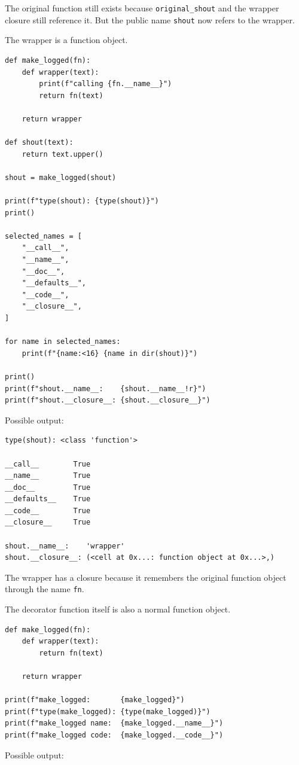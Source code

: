 The original function still exists because \texttt{original\_shout} and the wrapper closure still reference it. But the public name \texttt{shout} now refers to the wrapper.

The wrapper is a function object.

\begin{verbatim}
def make_logged(fn):
    def wrapper(text):
        print(f"calling {fn.__name__}")
        return fn(text)

    return wrapper

def shout(text):
    return text.upper()

shout = make_logged(shout)

print(f"type(shout): {type(shout)}")
print()

selected_names = [
    "__call__",
    "__name__",
    "__doc__",
    "__defaults__",
    "__code__",
    "__closure__",
]

for name in selected_names:
    print(f"{name:<16} {name in dir(shout)}")

print()
print(f"shout.__name__:    {shout.__name__!r}")
print(f"shout.__closure__: {shout.__closure__}")
\end{verbatim}

Possible output:

\begin{verbatim}
type(shout): <class 'function'>

__call__        True
__name__        True
__doc__         True
__defaults__    True
__code__        True
__closure__     True

shout.__name__:    'wrapper'
shout.__closure__: (<cell at 0x...: function object at 0x...>,)
\end{verbatim}

The wrapper has a closure because it remembers the original function object through the name \texttt{fn}.

The decorator function itself is also a normal function object.

\begin{verbatim}
def make_logged(fn):
    def wrapper(text):
        return fn(text)

    return wrapper

print(f"make_logged:       {make_logged}")
print(f"type(make_logged): {type(make_logged)}")
print(f"make_logged name:  {make_logged.__name__}")
print(f"make_logged code:  {make_logged.__code__}")
\end{verbatim}

Possible output:

